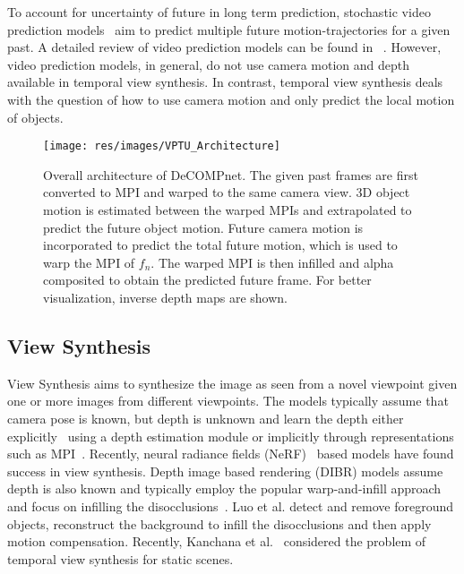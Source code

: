 \documentclass[preprint]{vgtc}
\def\etal{et al.}
\begin{document}
    To account for uncertainty of future in long term prediction, stochastic video prediction models~\cite{babaeizadeh2018stochastic,denton2018stochastic,villegas2019high} aim to predict multiple future motion-trajectories for a given past.
A detailed review of video prediction models can be found in ~\cite{oprea2020review}.
    However, video prediction models, in general, do not use camera motion and depth available in temporal view synthesis.
    In contrast, temporal view synthesis deals with the question of how to use camera motion and only predict the local motion of objects.


    \begin{figure*}
        \centering
        \texttt{[image: res/images/VPTU\_Architecture]}
        \caption{Overall architecture of DeCOMPnet.
        The given past frames are first converted to MPI and warped to the same camera view.
        3D object motion is estimated between the warped MPIs and extrapolated to predict the future object motion.
        Future camera motion is incorporated to predict the total future motion, which is used to warp the MPI of $f_n$.
        The warped MPI is then infilled and alpha composited to obtain the predicted future frame.
        For better visualization, inverse depth maps are shown.}
        \label{fig:architecture}
    \end{figure*}

    \subsection{View Synthesis}\label{subsec:related-work-view-synthesis}
    View Synthesis aims to synthesize the image as seen from a novel viewpoint given one or more images from different viewpoints.
    The models typically assume that camera pose is known, but depth is unknown and learn the depth either explicitly~\cite{wiles2020synsin,shih20203dp} using a depth estimation module or implicitly through representations such as MPI~\cite{zhou2018stereomag,srinivasan2019pushing}.
    Recently, neural radiance fields (NeRF)~\cite{mildenhall2020nerf} based models have found success in view synthesis.
    Depth image based rendering (DIBR) models assume depth is also known and typically employ the popular warp-and-infill approach and focus on infilling the disocclusions~\cite{cho2017hole,luo2020disocclusion}.
    Luo \etal\cite{luo2016hole} detect and remove foreground objects, reconstruct the background to infill the disocclusions and then apply motion compensation.
    Recently, Kanchana \etal~\cite{kanchana2022ivp} considered the problem of temporal view synthesis for static scenes.
\end{document}
